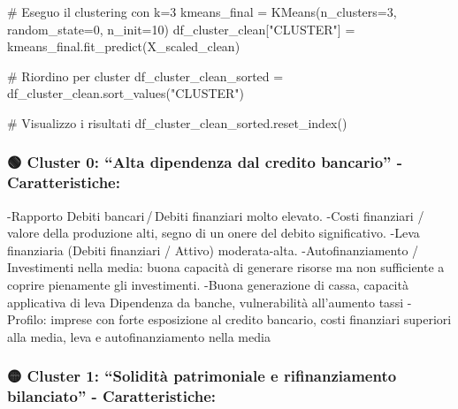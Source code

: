 \documentclass[
  letterpaper,
  DIV=11,
  numbers=noendperiod]{scrartcl}
\newenvironment{Shaded}{\begin{snugshade}}{\end{snugshade}}
\newcommand{\CommentTok}[1]{\textcolor[rgb]{0.37,0.37,0.37}{#1}}
\newcommand{\DecValTok}[1]{\textcolor[rgb]{0.68,0.00,0.00}{#1}}
\newcommand{\NormalTok}[1]{\textcolor[rgb]{0.00,0.23,0.31}{#1}}
\newcommand{\OperatorTok}[1]{\textcolor[rgb]{0.37,0.37,0.37}{#1}}
\newcommand{\StringTok}[1]{\textcolor[rgb]{0.13,0.47,0.30}{#1}}
\begin{document}
\begin{Shaded}
\begin{Highlighting}[]
\CommentTok{\# Eseguo il clustering con k=3}
\NormalTok{kmeans\_final }\OperatorTok{=}\NormalTok{ KMeans(n\_clusters}\OperatorTok{=}\DecValTok{3}\NormalTok{, random\_state}\OperatorTok{=}\DecValTok{0}\NormalTok{, n\_init}\OperatorTok{=}\DecValTok{10}\NormalTok{)}
\NormalTok{df\_cluster\_clean[}\StringTok{"CLUSTER"}\NormalTok{] }\OperatorTok{=}\NormalTok{ kmeans\_final.fit\_predict(X\_scaled\_clean)}

\CommentTok{\# Riordino per cluster}
\NormalTok{df\_cluster\_clean\_sorted }\OperatorTok{=}\NormalTok{ df\_cluster\_clean.sort\_values(}\StringTok{"CLUSTER"}\NormalTok{)}

\CommentTok{\# Visualizzo i risultati}
\NormalTok{df\_cluster\_clean\_sorted.reset\_index()}
\end{Highlighting}
\end{Shaded}

\subsubsection{🟢 Cluster 0: ``Alta dipendenza dal credito bancario'' -
Caratteristiche:}\label{cluster-0-alta-dipendenza-dal-credito-bancario---caratteristiche}

-Rapporto Debiti bancari\,/\,Debiti finanziari molto elevato. -Costi
finanziari / valore della produzione alti, segno di un onere del debito
significativo. -Leva finanziaria (Debiti finanziari / Attivo)
moderata-alta. -Autofinanziamento / Investimenti nella media: buona
capacità di generare risorse ma non sufficiente a coprire pienamente gli
investimenti. -Buona generazione di cassa, capacità applicativa di leva
Dipendenza da banche, vulnerabilità all'aumento tassi - Profilo: imprese
con forte esposizione al credito bancario, costi finanziari superiori
alla media, leva e autofinanziamento nella media

\subsubsection{🟡 Cluster 1: ``Solidità patrimoniale e rifinanziamento
bilanciato'' -
Caratteristiche:}\label{cluster-1-solidituxe0-patrimoniale-e-rifinanziamento-bilanciato---caratteristiche}
\end{document}
